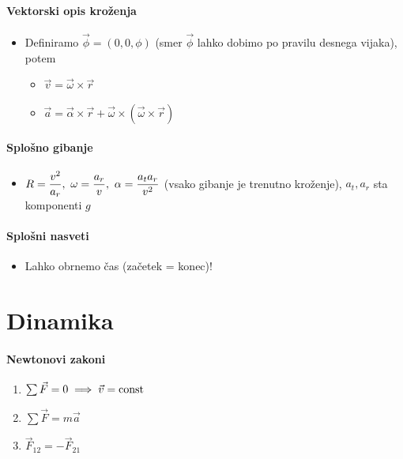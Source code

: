 \paragraph{Vektorski opis kroženja}
\begin{itemize}
    \item Definiramo \(\vec{\phi} = (0, 0, \phi)\) (smer \(\vec{\phi}\) lahko dobimo po pravilu desnega vijaka), potem
    \begin{itemize}
        \item \(\vec{v} = \vec{\omega} \times \vec{r}\)
        \item \(\vec{a} = \vec{\alpha} \times \vec{r} + \vec{\omega} \times (\vec{\omega} \times \vec{r})\)
    \end{itemize}
\end{itemize}

\paragraph{Splošno gibanje}
\begin{itemize}
    \item \(\displaystyle R = \frac{v^2}{a_r}, \ \omega = \frac{a_r}{v}, \ \alpha = \frac{a_t a_r}{v^2}\) (vsako gibanje je trenutno kroženje), \(a_t, a_r\) sta komponenti \(g\)
\end{itemize}

\paragraph{Splošni nasveti}
\begin{itemize}
    \item Lahko obrnemo čas (začetek = konec)!
\end{itemize}

\section{Dinamika}
\paragraph{Newtonovi zakoni}
\begin{enumerate}
    \item \(\sum \vec{F} = 0 \implies \vec{v} = \text{const}\)
    \item \(\sum \vec{F} = m \vec{a}\) 
    \item \(\vec{F}_{12} = -\vec{F}_{21}\) 
\end{enumerate}

